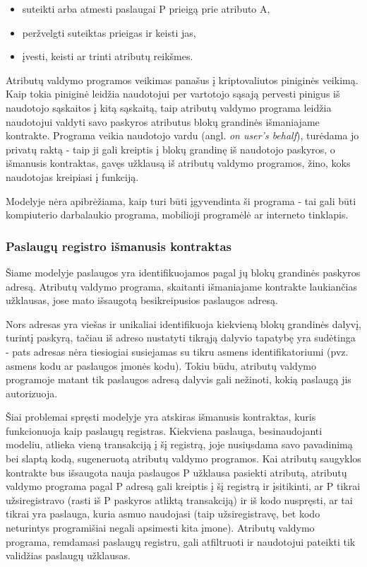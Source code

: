 \begin{itemize}
    \item suteikti arba atmesti paslaugai P prieigą prie atributo A,
    \item peržvelgti suteiktas prieigas ir keisti jas,
    \item įvesti, keisti ar trinti atributų reikšmes.
\end{itemize}

Atributų valdymo programos veikimas panašus į kriptovaliutos piniginės veikimą. Kaip tokia piniginė leidžia naudotojui per vartotojo sąsają
pervesti pinigus iš naudotojo sąskaitos į kitą sąskaitą, taip atributų valdymo programa leidžia naudotojui
valdyti savo paskyros atributus blokų grandinės išmaniajame kontrakte. Programa veikia naudotojo vardu (angl. \textit{on user's behalf}),
turėdama jo privatų raktą
- taip ji gali kreiptis į blokų grandinę
iš naudotojo paskyros, o išmanusis kontraktas, gavęs užklausą iš atributų valdymo programos,
žino, koks naudotojas kreipiasi į funkciją.

Modelyje nėra apibrėžiama, kaip turi būti įgyvendinta ši programa - tai gali būti kompiuterio darbalaukio programa,
mobilioji programėlė ar interneto tinklapis. 

\subsubsection{Paslaugų registro išmanusis kontraktas} \label{BCIDM:serviceRegister}

Šiame modelyje paslaugos yra identifikuojamos pagal jų blokų grandinės paskyros adresą. Atributų valdymo programa,
skaitanti išmaniajame kontrakte laukiančias užklausas, jose mato išsaugotą besikreipusios paslaugos adresą.

Nors adresas yra viešas ir unikaliai identifikuoja kiekvieną blokų grandinės dalyvį, turintį paskyrą, tačiau iš adreso nustatyti tikrąją dalyvio tapatybę yra sudėtinga -
pats adresas nėra tiesiogiai susiejamas su tikru asmens identifikatoriumi (pvz. asmens kodu ar paslaugos įmonės kodu).
Tokiu būdu, atributų valdymo programoje matant tik paslaugos adresą dalyvis gali nežinoti, kokią paslaugą jis autorizuoja.

Šiai problemai spręsti modelyje yra atskiras išmanusis kontraktas, kuris funkcionuoja kaip paslaugų registras. Kiekviena
paslauga, besinaudojanti modeliu, atlieka vieną transakciją į šį registrą, joje nusiųsdama savo pavadinimą bei slaptą kodą,
sugeneruotą atributų valdymo programos. Kai atributų saugyklos kontrakte bus išsaugota nauja paslaugos
P užklausa pasiekti atributą, atributų valdymo programa pagal P adresą gali kreiptis
į šį registrą ir įsitikinti, ar P tikrai užsiregistravo (rasti iš P paskyros atliktą transakciją) ir iš kodo
nuspręsti, ar tai tikrai yra paslauga, kuria asmuo naudojasi (taip užsiregistravę, bet kodo neturintys programišiai negali
apsimesti kita įmone). Atributų valdymo programa, remdamasi paslaugų registru, gali atfiltruoti ir naudotojui pateikti tik
validžias paslaugų užklausas.

